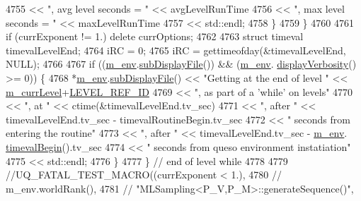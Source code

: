 \begin{DoxyCode}
{{{{4755                                 << \textcolor{stringliteral}{", avg level seconds = "} << avgLevelRunTime
4756                                 << \textcolor{stringliteral}{", max level seconds = "} << maxLevelRunTime
4757                                 << std::endl;
4758       \}
4759     \}
4760 
4761     \textcolor{keywordflow}{if} (currExponent != 1.) \textcolor{keyword}{delete} currOptions;
4762 
4763     \textcolor{keyword}{struct }timeval timevalLevelEnd;
4764     iRC = 0;
4765     iRC = gettimeofday(&timevalLevelEnd, NULL);
4766 
4767     \textcolor{keywordflow}{if} ((\hyperlink{class_q_u_e_s_o_1_1_m_l_sampling_a13f1ca4fe9f94822fe572a743eaced1d}{m\_env}.\hyperlink{class_q_u_e_s_o_1_1_base_environment_a8a0064746ae8dddfece4229b9ad374d6}{subDisplayFile}()) && (\hyperlink{class_q_u_e_s_o_1_1_m_l_sampling_a13f1ca4fe9f94822fe572a743eaced1d}{m\_env}.
      \hyperlink{class_q_u_e_s_o_1_1_base_environment_a1fe5f244fc0316a0ab3e37463f108b96}{displayVerbosity}() >= 0)) \{
4768       *\hyperlink{class_q_u_e_s_o_1_1_m_l_sampling_a13f1ca4fe9f94822fe572a743eaced1d}{m\_env}.\hyperlink{class_q_u_e_s_o_1_1_base_environment_a8a0064746ae8dddfece4229b9ad374d6}{subDisplayFile}() << \textcolor{stringliteral}{"Getting at the end of level "} << 
      \hyperlink{class_q_u_e_s_o_1_1_m_l_sampling_af9416874c856e50f3b35270e801f17e4}{m\_currLevel}+\hyperlink{_m_l_sampling_level_options_8h_a68d15eaf394d210effcf584b938206d3}{LEVEL\_REF\_ID}
4769                               << \textcolor{stringliteral}{", as part of a 'while' on levels"}
4770                               << \textcolor{stringliteral}{", at  "}   << ctime(&timevalLevelEnd.tv\_sec)
4771                               << \textcolor{stringliteral}{", after "} << timevalLevelEnd.tv\_sec - timevalRoutineBegin.tv\_sec
4772                               << \textcolor{stringliteral}{" seconds from entering the routine"}
4773                               << \textcolor{stringliteral}{", after "} << timevalLevelEnd.tv\_sec - \hyperlink{class_q_u_e_s_o_1_1_m_l_sampling_a13f1ca4fe9f94822fe572a743eaced1d}{m\_env}.
      \hyperlink{class_q_u_e_s_o_1_1_base_environment_a1adcf7ca2d95e75a29360bcfe091cd65}{timevalBegin}().tv\_sec
4774                               << \textcolor{stringliteral}{" seconds from queso environment instatiation"}
4775                               << std::endl;
4776     \}
4777   \} \textcolor{comment}{// end of level while}
4778 
4779   \textcolor{comment}{//UQ\_FATAL\_TEST\_MACRO((currExponent < 1.),}
4780   \textcolor{comment}{//                    m\_env.worldRank(),}
4781   \textcolor{comment}{//                    "MLSampling<P\_V,P\_M>::generateSequence()",}
}}}}
\end{DoxyCode}
